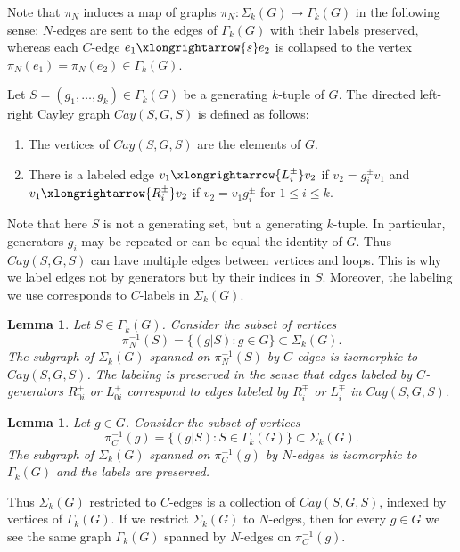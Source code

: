 \documentclass[12pt]{amsart}
\newtheorem{lemma}[theorem]{Lemma}
\theoremstyle{definition}
\numberwithin{figure}{section}
\numberwithin{table}{section}
\numberwithin{equation}{section}
\begin{document}
Note that $\pi_N$ induces a map of graphs $\pi_N \colon \Sigma_k(G) \to \Gamma_k(G)$ in the following sense: $N$-edges are sent to the edges of $\Gamma_k(G)$ with their labels preserved, whereas each $C$-edge $e_1 \xlongrightarrow{s} e_2$ is collapsed to the vertex $\pi_N(e_1)=\pi_N(e_2) \in \Gamma_k(G)$.

Let $S = (g_1,\ldots,g_k) \in \Gamma_k(G)$ be a generating $k$-tuple of $G$. 
The directed left-right Cayley graph $Cay(S,G,S)$ is defined as follows: 

\begin{enumerate}
\item
The vertices of $Cay(S,G,S)$ are the elements of $G$.
\item There is a labeled edge $v_1 \xlongrightarrow{L^{\pm}_i} v_2$ if $v_2 = g_i^{\pm}v_1$ and  $v_1 \xlongrightarrow{R^{\pm}_i} v_2$ if $v_2 = v_1g_i^{\pm}$ for $1 \leq i \leq k$.
\end{enumerate}

Note that here $S$ is not a generating set, but a generating $k$-tuple. In particular, generators $g_i$ may be repeated or can be equal the identity of $G$.
Thus $Cay(S,G,S)$ can have multiple edges between vertices and loops. This is why we label edges not by generators but by their indices in $S$. Moreover, the labeling we use corresponds to $C$-labels in $\Sigma_k(G)$.

\begin{lemma}
Let $S \in \Gamma_k(G)$. Consider the subset of vertices 
$$\pi_N^{-1}(S) = \{(g|S) \colon g \in G \} \subset \Sigma_k(G).$$
The subgraph of $\Sigma_k(G)$ spanned on $\pi_N^{-1}(S)$ by $C$-edges is isomorphic to $Cay(S,G,S)$. The labeling is preserved in the sense that edges labeled by $C$-generators $R^{\pm}_{0i}$ or $L^{\pm}_{0i}$ correspond to edges labeled by $R^{\mp}_i$ or $L^{\mp}_i$ in $Cay(S,G,S)$.
\end{lemma}

\begin{lemma}
Let $g \in G$. Consider the subset of vertices 
$$\pi_C^{-1}(g) = \{(g|S) \colon S \in \Gamma_k(G) \} \subset \Sigma_k(G).$$
The subgraph of $\Sigma_k(G)$ spanned on $\pi_C^{-1}(g)$ by $N$-edges is isomorphic to $\Gamma_k(G)$ and the labels are preserved. 
\end{lemma}

Thus $\Sigma_k(G)$ restricted to $C$-edges is a collection of $Cay(S,G,S)$, indexed by vertices of $\Gamma_k(G)$.
If we restrict $\Sigma_k(G)$  to $N$-edges, then for every $g \in G$ we see the same graph $\Gamma_k(G)$ spanned by $N$-edges on $\pi_C^{-1}(g)$.
\end{document}

